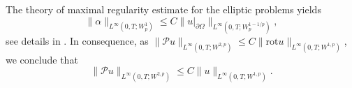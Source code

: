 \documentclass[11pt]{article}
\newcommand{\dd}{\mathrm{d}}
\newcommand{\cP}{\mathcal{P}}
\newcommand{\cQ}{\mathcal{Q}}
\newtheorem{lem}[tw]{Lemma}
\numberwithin{equation}{section}
\numberwithin{tw}{section}
\begin{document}
The theory of maximal regularity estimate for the elliptic problems yields
\begin{equation}
    \|\alpha \|_{L^\infty(0,T;W^1_p)}\leq C \|u|_{\partial \Omega}\|_{L^\infty(0,T;W^{1-1/p}_p)},
\end{equation}
see details in \cite{Mucha-Pokorny}. In consequence, as $\|\mathcal{P}u\|_{L^\infty(0,T;W^{2,p})}\leq C\|\mathrm{rot}u\|_{L^\infty(0,T;W^{1,p})}$, we conclude that
\begin{equation}\label{Pu}
    \|\cP u\|_{L^\infty(0,T;W^{2,p})} \leq C\|u\|_{L^\infty(0,T;W^{1,p})}.
\end{equation}
%
%
\end{document}
